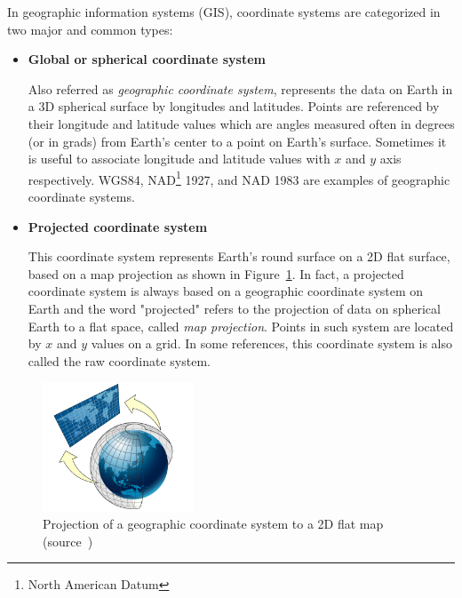 \documentclass[a4paper,12pt]{article}
\begin{document}
  
In geographic information systems (GIS), coordinate systems are categorized in two major and common types:
\begin{itemize}
\item \textbf{Global or spherical coordinate system} 

Also referred as \textit{geographic coordinate system}, represents the data on Earth in a 3D spherical surface by longitudes and latitudes. Points are referenced by their longitude and latitude values which are angles measured often in degrees (or in grads) from Earth's center to a point on Earth's surface. Sometimes it is useful to associate longitude and latitude values with $x$ and $y$ axis respectively. WGS84, NAD\footnote{North American Datum} 1927, and NAD 1983 are examples of geographic coordinate systems. 

\item \textbf{Projected coordinate system} 

This coordinate system represents Earth's round surface on a 2D flat surface, based on a map projection as shown in Figure~\ref{figproject}. In fact, a projected coordinate system is always based on a geographic coordinate system on Earth and the word "projected" refers to the projection of data on spherical Earth to a flat space, called \textit{map projection}. Points in such system are located by $x$ and $y$ values on a grid. 
In some references, this coordinate system is also called the raw coordinate system.
\end{itemize}

\begin{figure}
\centering
\includegraphics[width=0.4\textwidth]{sphere_to_cylinder}
\caption{Projection of a geographic coordinate system to a 2D flat map (source~\cite{projected})}
\label{figproject}
\end{figure}
\end{document}
